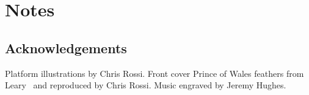 \part{Notes}

\chapter{Acknowledgements}

Platform illustrations by Chris Rossi. Front cover Prince of Wales feathers from Leary~\cite{leary} and reproduced by Chris Rossi. Music engraved by Jeremy Hughes.
